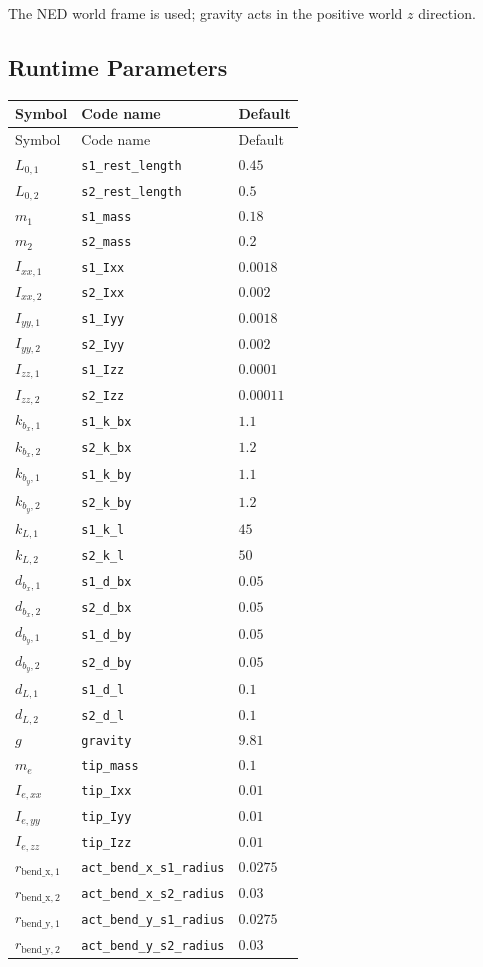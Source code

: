 \documentclass[11pt]{article}
\begin{document}
The NED world frame is used; gravity acts in the positive world $z$ direction.
\subsection{Runtime Parameters}
\begin{longtable}{lll}
\hline
Symbol & Code name & Default \\
\hline
\endfirsthead
\hline Symbol & Code name & Default \\
\hline
\endhead
$L_{0,1}$ & \texttt{s1\_rest\_length} & $0.45$ \\
$L_{0,2}$ & \texttt{s2\_rest\_length} & $0.5$ \\
$m_{1}$ & \texttt{s1\_mass} & $0.18$ \\
$m_{2}$ & \texttt{s2\_mass} & $0.2$ \\
$I_{xx,1}$ & \texttt{s1\_Ixx} & $0.0018$ \\
$I_{xx,2}$ & \texttt{s2\_Ixx} & $0.002$ \\
$I_{yy,1}$ & \texttt{s1\_Iyy} & $0.0018$ \\
$I_{yy,2}$ & \texttt{s2\_Iyy} & $0.002$ \\
$I_{zz,1}$ & \texttt{s1\_Izz} & $0.0001$ \\
$I_{zz,2}$ & \texttt{s2\_Izz} & $0.00011$ \\
$k_{b_x,1}$ & \texttt{s1\_k\_bx} & $1.1$ \\
$k_{b_x,2}$ & \texttt{s2\_k\_bx} & $1.2$ \\
$k_{b_y,1}$ & \texttt{s1\_k\_by} & $1.1$ \\
$k_{b_y,2}$ & \texttt{s2\_k\_by} & $1.2$ \\
$k_{L,1}$ & \texttt{s1\_k\_l} & $45$ \\
$k_{L,2}$ & \texttt{s2\_k\_l} & $50$ \\
$d_{b_x,1}$ & \texttt{s1\_d\_bx} & $0.05$ \\
$d_{b_x,2}$ & \texttt{s2\_d\_bx} & $0.05$ \\
$d_{b_y,1}$ & \texttt{s1\_d\_by} & $0.05$ \\
$d_{b_y,2}$ & \texttt{s2\_d\_by} & $0.05$ \\
$d_{L,1}$ & \texttt{s1\_d\_l} & $0.1$ \\
$d_{L,2}$ & \texttt{s2\_d\_l} & $0.1$ \\
$g$ & \texttt{gravity} & $9.81$ \\
$m_e$ & \texttt{tip\_mass} & $0.1$ \\
$I_{e,xx}$ & \texttt{tip\_Ixx} & $0.01$ \\
$I_{e,yy}$ & \texttt{tip\_Iyy} & $0.01$ \\
$I_{e,zz}$ & \texttt{tip\_Izz} & $0.01$ \\
$r_{\mathrm{bend\_x},1}$ & \texttt{act\_bend\_x\_s1\_radius} & $0.0275$ \\
$r_{\mathrm{bend\_x},2}$ & \texttt{act\_bend\_x\_s2\_radius} & $0.03$ \\
$r_{\mathrm{bend\_y},1}$ & \texttt{act\_bend\_y\_s1\_radius} & $0.0275$ \\
$r_{\mathrm{bend\_y},2}$ & \texttt{act\_bend\_y\_s2\_radius} & $0.03$ \\
\hline
\end{longtable}
\end{document}
